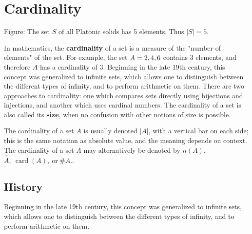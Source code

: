 \section{Cardinality}
\label{sec:card-e104}





Figure: The set $S$ of all Platonic solids has 5 elements. Thus $|S|=5$.



In mathematics, the \textbf{cardinality} of a set is a measure of the "number of elements"
of the set. For example, the set $A = \\{2, 4, 6\\}$ contains 3 elements, and therefore
$A$ has a cardinality of 3. Beginning in the late 19th century, this concept was
generalized to infinite sets, which allows one to distinguish between the different types
of infinity, and to perform arithmetic on them. There are two approaches to cardinality:
one which compares sets directly using bijections and injections, and another which uses
cardinal numbers. The cardinality of a set is also called its \textbf{size}, when no
confusion with other notions of size is possible.



The cardinality of a set $A$ is usually denoted $|A|$, with a vertical bar on each side;
this is the same notation as absolute value, and the meaning depends on context. The
cardinality of a set $A$ may alternatively be denoted by $n(A)$,
$\overline{\overline{A}},\ \operatorname{card}(A),\ \text{or}\ \#A.$.




\subsection{History}
\label{sss:hist-3cd1}




Beginning in the late 19th century, this concept was generalized to infinite sets, which
allows one to distinguish between the different types of infinity, and to perform
arithmetic on them.




